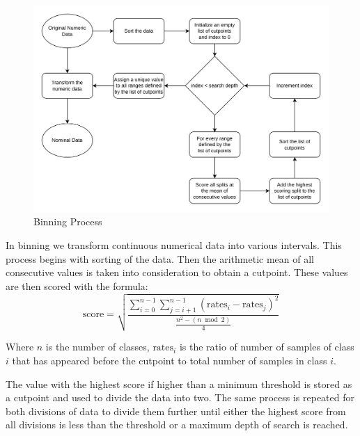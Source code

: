 \documentclass[pdflatex,sn-mathphys-num]{sn-jnl}%
\let\oldcaption\caption
\renewcommand{\caption}[1]{\oldcaption{\centering #1}}
\theoremstyle{thmstyleone}%
\theoremstyle{thmstyletwo}%
\theoremstyle{thmstylethree}%
\begin{document}
\begin{figure}[ht!]
  \centering
  \includegraphics[width=0.8\linewidth]{Binning.drawio.png}
  \caption{Binning Process}
  \label{fig:Binning}
\end{figure}

In binning we transform continuous numerical data into various intervals.
This process begins with sorting of the data.
Then the arithmetic mean of all consecutive values is taken into consideration to obtain a cutpoint.
These values are then scored with the formula:
\begin{equation}
  \label{eq:score}
  \text{score} = \sqrt{\frac{\sum_{i=0}^{n-1} \sum_{j=i+1}^{n-1} (\text{rates}_i - \text{rates}_j)^2}{\frac{n^2 - (n \bmod 2)}{4}}}
\end{equation}
\begin{center}
  \footnotesize{Where \(n\) is the number of classes, \(\text{rates}_i\) is the ratio of number of samples of class \(i\) that has appeared before the cutpoint to total number of samples in class \(i\).}
\end{center}

The value with the highest score if higher than a minimum threshold is stored as a cutpoint and used to divide the data into two.
The same process is repeated for both divisions of data to divide them further until either the highest score from all divisions is less than the threshold or a maximum depth of search is reached.
\end{document}
